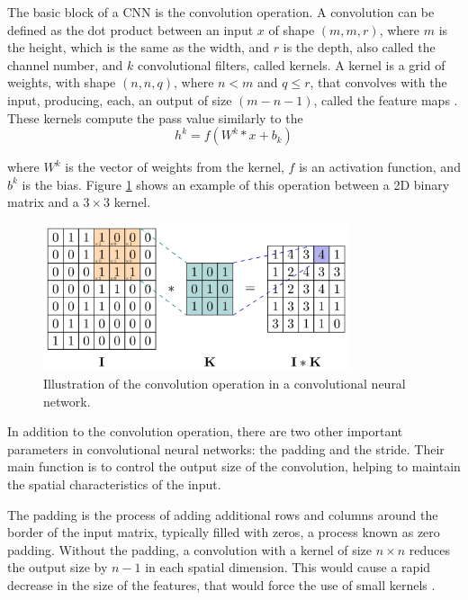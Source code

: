 The basic block of a CNN is the convolution operation. A convolution can be defined as the dot product between an input $x$ of shape $(m,m,r)$, where $m$ is the height, which is the same as the width, and $r$ is the depth, also called the channel number, and $k$ convolutional filters, called kernels. A kernel is a grid of weights, with shape $(n,n, q)$, where $n < m$ and $q \leq r$, that convolves with the input, producing, each, an output of size $(m-n-1)$, called the feature maps \cite{Alzubaidi_Zhang_Humaidi_Al_Dujaili_Duan_Al_Shamma_Santamaria_Fadhel_Al_Amidie_Farhan_2021}. These kernels compute the pass value similarly to the 
\begin{equation}
    h^k = f\left(W^k * x + b_k\right)
\end{equation}

where $W^k$ is the vector of weights from the kernel, $f$ is an activation function, and $b^k$ is the bias. Figure \ref{fig:conv-example} shows an example of this operation between a 2D binary matrix and a $3\times3$ kernel. 

\begin{figure}[H]
    \centering
    \includegraphics[width=9cm]{Cap2_LitReview/model_basics/Convolutional_NN/conv2d.png}
    \caption{Illustration of the convolution operation in a convolutional neural network. \cite{Riebesell_2022}}
    \label{fig:conv-example}
\end{figure}

In addition to the convolution operation, there are two other important parameters in convolutional neural networks: the padding and the stride. Their main function is to control the output size of the convolution, helping to maintain the spatial characteristics of the input. 

The padding is the process of adding additional rows and columns around the border of the input matrix, typically filled with zeros, a process known as zero padding. Without the padding, a convolution with a kernel of size $n\times n$ reduces the output size by $n-1$ in each spatial dimension. This would cause a rapid decrease in the size of the features, that would force the use of small kernels \cite{Goodfellow_Bengio_Courville_2018}.

